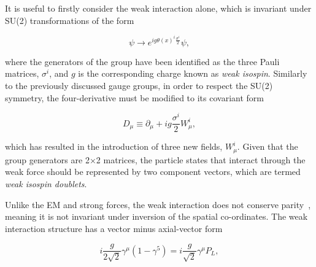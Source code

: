 It is useful to firstly consider the weak interaction alone, which is invariant under SU(2) transformations of the form

\begin{equation}
    \psi \rightarrow e^{ig\theta(x)^{i}\frac{\sigma^{i}}{2}}\psi,
\end{equation}

\noindent where the generators of the group have been identified as the three Pauli matrices, $\sigma^{i}$, and $g$ is the corresponding charge known as \textit{weak isospin}. Similarly to the previously discussed gauge groups, in order to respect the SU(2) symmetry, the four-derivative must be modified to its covariant form

\begin{equation}
    D_\mu \equiv \partial_\mu + ig\frac{\sigma^{i}}{2}W_{\mu}^{i},
\end{equation}

\noindent which has resulted in the introduction of three new fields, $W_{\mu}^{i}$. Given that the group generators are 2$\times$2 matrices, the particle states that interact through the weak force should be represented by two component vectors, which are termed \textit{weak isospin doublets}. 

Unlike the EM and strong forces, the weak interaction does not conserve parity~\cite{ParityViolation}, meaning it is not invariant under inversion of the spatial co-ordinates. The weak interaction structure has a vector minus axial-vector form %

\begin{equation}
    i\frac{g}{2\sqrt{2}} \gamma^{\mu}(1-\gamma^{5})  = i\frac{g}{\sqrt{2}} \gamma^{\mu}P_{L},
\end{equation}

